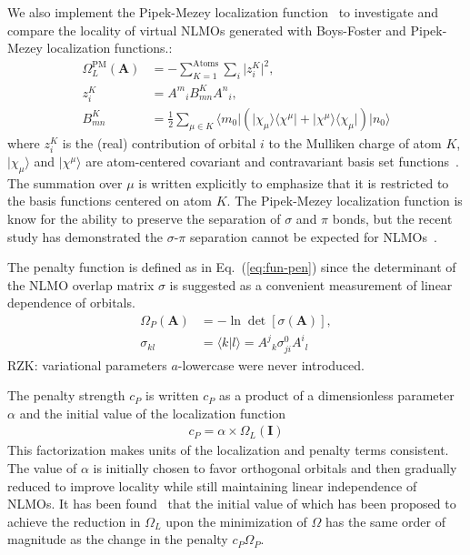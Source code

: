 \documentclass[aps,prl,reprint,amsmath,amssymb]{revtex4-1}
\newcommand{\ket}[1]{\ensuremath{\vert #1 \rangle}}
\newcommand{\bra}[1]{\ensuremath{\langle #1 \vert}}
\newcommand{\braket}[2]{\ensuremath{\langle #1 \vert #2 \rangle}} %
\newcommand{\ketbra}[2]{\ensuremath{\vert #1 \rangle \langle #2 \vert}} %
\begin{document}
We also implement the Pipek-Mezey localization function~\cite{pipek1989fast,lehtola2014pipek} to investigate and compare the locality of virtual NLMOs generated with Boys-Foster and Pipek-Mezey localization functions.:
%
\begin{equation} \label{eq:pipek}
\begin{split}
\Omega_L^{\text{PM}}(\mathbf{A}) &= - \sum_{K=1}^{\text{Atoms}} \sum_i \vert z_{i}^{K} \vert^2, \\
z_{i}^{K} &= {A^m}_i B^{K}_{mn} {A^n}_i, \\
B^{K}_{mn} &= \frac{1}{2} \sum_{\mu \in K} \bra{m_0}  \left( \ketbra{\chi_{\mu}}{\chi^{\mu}} + \ketbra{\chi^{\mu}}{\chi_{\mu}} \right) \ket{n_0}
\end{split}
\end{equation}
%
where $z_{i}^{K}$ is the (real) contribution of orbital $i$ to the Mulliken charge of atom $K$, $\ket{\chi_\mu}$ and $\ket{\chi^\mu}$ are atom-centered covariant and contravariant basis set functions~\cite{silvestrelli1999maximally, berghold2000general}. The summation over $\mu$ is written explicitly to emphasize that it is restricted to the basis functions centered on atom $K$. 
The Pipek-Mezey localization function is know for the ability to preserve the separation of $\sigma$ and $\pi$ bonds, but the recent study has demonstrated the $\sigma$-$\pi$ separation cannot be expected for NLMOs~\cite{luo2020direct}.

The penalty function is defined as in Eq.~(\ref{eq:fun-pen}) since the determinant of the NLMO overlap matrix $\sigma$ is suggested as a convenient measurement of linear dependence of orbitals. 
%
\begin{equation} \label{eq:fun-pen}
\begin{split}
\Omega_P(\mathbf{A}) &= - \ln \det \left[ \sigma (\mathbf{A}) \right], \\
\sigma_{kl} &= \braket{k}{l} = {A^j}_k \sigma_{ji}^0{A^i}_l
\end{split}
\end{equation}
%
RZK: variational parameters $a$-lowercase were never introduced.

The penalty strength $c_P$ is written $c_P$ as a product of a dimensionless parameter $\alpha$ and the initial value of the localization function
%
\begin{equation} \label{eq:cp-beta}
\begin{split} 
c_P = \alpha \times \Omega_L(\mathbf{I})
\end{split}
\end{equation}
%
This factorization makes units of the localization and penalty terms consistent. The value of $\alpha$ is initially chosen to favor orthogonal orbitals and then gradually reduced to improve locality while still maintaining linear independence of NLMOs. 
It has been found~\cite{luo2020direct} that the initial value of  which has been proposed to achieve the reduction in $\Omega_L$ upon the minimization of $\Omega$ has the same order of magnitude as the change in the penalty  $c_P\Omega_P$.
\end{document}
